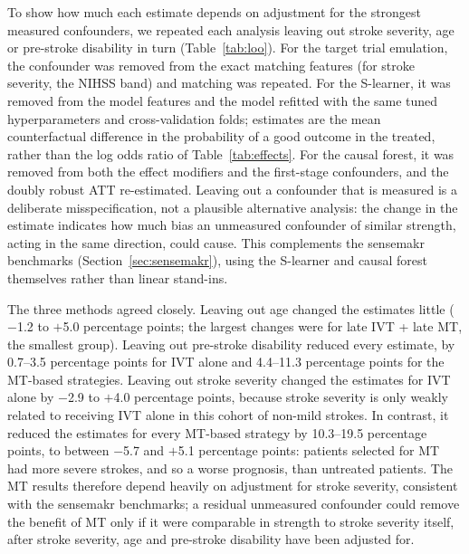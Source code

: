 To show how much each estimate depends on adjustment for the strongest measured confounders, we repeated each analysis leaving out stroke severity, age or pre-stroke disability in turn (Table~\ref{tab:loo}). For the target trial emulation, the confounder was removed from the exact matching features (for stroke severity, the NIHSS band) and matching was repeated. For the S-learner, it was removed from the model features and the model refitted with the same tuned hyperparameters and cross-validation folds; estimates are the mean counterfactual difference in the probability of a good outcome in the treated, rather than the log odds ratio of Table~\ref{tab:effects}. For the causal forest, it was removed from both the effect modifiers and the first-stage confounders, and the doubly robust ATT re-estimated. Leaving out a confounder that is measured is a deliberate misspecification, not a plausible alternative analysis: the change in the estimate indicates how much bias an unmeasured confounder of similar strength, acting in the same direction, could cause. This complements the sensemakr benchmarks (Section~\ref{sec:sensemakr}), using the S-learner and causal forest themselves rather than linear stand-ins.

The three methods agreed closely. Leaving out age changed the estimates little ($-$1.2 to $+$5.0 percentage points; the largest changes were for late IVT + late MT, the smallest group). Leaving out pre-stroke disability reduced every estimate, by 0.7--3.5 percentage points for IVT alone and 4.4--11.3 percentage points for the MT-based strategies. Leaving out stroke severity changed the estimates for IVT alone by $-$2.9 to $+$4.0 percentage points, because stroke severity is only weakly related to receiving IVT alone in this cohort of non-mild strokes. In contrast, it reduced the estimates for every MT-based strategy by 10.3--19.5 percentage points, to between $-$5.7 and $+$5.1 percentage points: patients selected for MT had more severe strokes, and so a worse prognosis, than untreated patients. The MT results therefore depend heavily on adjustment for stroke severity, consistent with the sensemakr benchmarks; a residual unmeasured confounder could remove the benefit of MT only if it were comparable in strength to stroke severity itself, after stroke severity, age and pre-stroke disability have been adjusted for.

